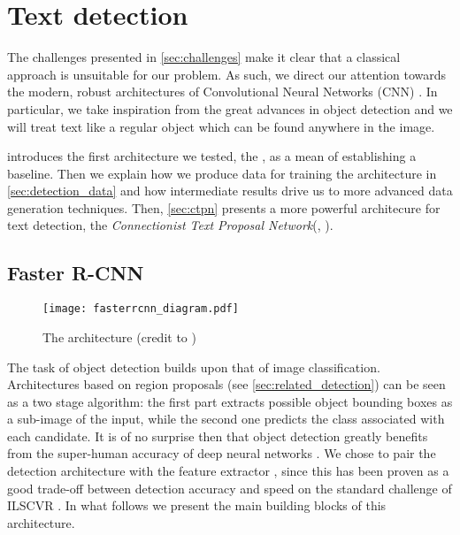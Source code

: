 \chapter{Text detection}
\label{ch:detection}

The challenges presented in \autoref{sec:challenges} make it clear that a classical approach is unsuitable for our problem. As such, we direct our attention towards the modern, robust architectures of Convolutional Neural Networks (CNN) \citep{leCun_CNN}. In particular, we take inspiration from the great advances in object detection and we will treat text like a regular object which can be found anywhere in the image.

 introduces the first architecture we tested, the \FRCNN{} \citep{faster_rcnn}, as a mean of establishing a baseline. Then we explain how we produce data for training the architecture in \autoref{sec:detection_data} and how intermediate results drive us to more advanced data generation techniques. Then, \autoref{sec:ctpn} presents a more powerful architecure for text detection, the \emph{Connectionist Text Proposal Network}(\CTPN{}, \citet{ctpn}). 



\section{Faster R-CNN}\label{sec:faster_rcnn}

	\begin{figure}
		\centering
		\texttt{[image: fasterrcnn\_diagram.pdf]}
		\caption{The \FRCNN{} architecture (credit to \cite{detection_benchmark}) \label{fig:faster_rcnn}}
	\end{figure}

	The task of object detection builds upon that of image classification. Architectures based on region proposals (see \autoref{sec:related_detection}) can be seen as a two stage algorithm: the first part extracts possible object bounding boxes as a sub-image of the input, while the second one predicts the class associated with each candidate. It is of no surprise then that object detection greatly benefits from the super-human accuracy of deep neural networks \citep{superhuman_classif}. We chose to pair the \FRCNN{} detection architecture with the \RESNET{} feature extractor \citep{resnet}, since this has been proven as a good trade-off between detection accuracy and speed on the standard challenge of ILSCVR \citep{detection_benchmark}. In what follows we present the main building blocks of this architecture.

